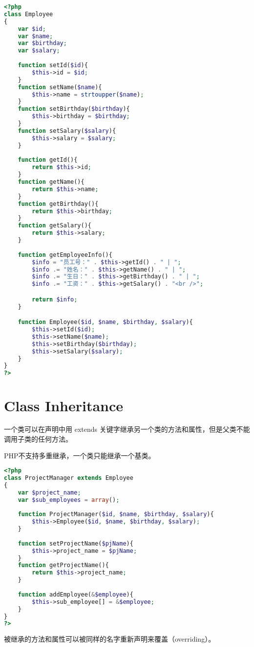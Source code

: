 \begin{lstlisting}[language=PHP]
<?php
class Employee
{
	var $id;
	var $name;
	var $birthday;
	var $salary;
	
	function setId($id){
		$this->id = $id;
	}
	function setName($name){
		$this->name = strtoupper($name);
	}
	function setBirthday($birthday){
		$this->birthday = $birthday;
	}
	function setSalary($salary){
		$this->salary = $salary;
	}
	
	function getId(){
		return $this->id;
	}
	function getName(){
		return $this->name;
	}
	function getBirthday(){
		return $this->birthday;
	}
	function getSalary(){
		return $this->salary;
	}
	
	function getEmployeeInfo(){
		$info = "员工号：" . $this->getId() . " | ";
		$info .= "姓名：" . $this->getName() . " | ";
		$info .= "生日：" . $this->getBirthday() . " | ";
		$info .= "工资：" . $this->getSalary() . "<br />";

		return $info;
	}

	function Employee($id, $name, $birthday, $salary){
		$this->setId($id);
		$this->setName($name);
		$this->setBirthday($birthday);
		$this->setSalary($salary);
	}
}
?>
\end{lstlisting}





\section{Class Inheritance}

一个类可以在声明中用 extends 关键字继承另一个类的方法和属性，但是父类不能调用子类的任何方法。

PHP不支持多重继承，一个类只能继承一个基类。


\begin{lstlisting}[language=PHP]
<?php
class ProjectManager extends Employee
{
	var $project_name;
	var $sub_employees = array();
	
	function ProjectManager($id, $name, $birthday, $salary){
		$this->Employee($id, $name, $birthday, $salary);
	}
	
	function setProjectName($pjName){
		$this->project_name = $pjName;
	}
	function getProjectName(){
		return $this->project_name;
	}
	
	function addEmployee(&$employee){
		$this->sub_employee[] = &$employee;
	}
}
?>
\end{lstlisting}

被继承的方法和属性可以被同样的名字重新声明来覆盖（overriding）。

